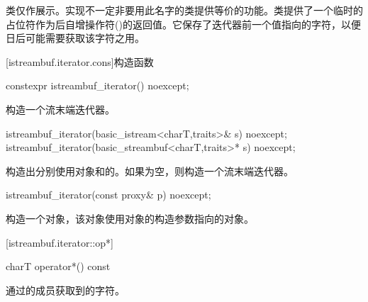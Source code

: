 \pnum
类仅作展示。实现不一定非要用此名字的类提供等价的功能。类提供了一个临时的占位符作为后自增操作符()的返回值。它保存了迭代器前一个值指向的字符，以便日后可能需要获取该字符之用。

[istreambuf.iterator.cons]{构造函数}


%
\begin{itemdecl}
constexpr istreambuf_iterator() noexcept;
\end{itemdecl}

\begin{itemdescr}
\pnum
\effects
构造一个流末端迭代器。
\end{itemdescr}


%
\begin{itemdecl}
istreambuf_iterator(basic_istream<charT,traits>& s) noexcept;
istreambuf_iterator(basic_streambuf<charT,traits>* s) noexcept;
\end{itemdecl}

\begin{itemdescr}
\pnum
\effects
构造出分别使用对象和的。如果为空，则构造一个流末端迭代器。
\end{itemdescr}

%
\begin{itemdecl}
istreambuf_iterator(const proxy& p) noexcept;
\end{itemdecl}

\begin{itemdescr}
\pnum
\effects
构造一个对象，该对象使用对象的构造参数指向的对象。
\end{itemdescr}

[istreambuf.iterator::op*]{}

%
\begin{itemdecl}
charT operator*() const
\end{itemdecl}

\begin{itemdescr}
\pnum
\returns
通过的成员获取到的字符。
\end{itemdescr}

